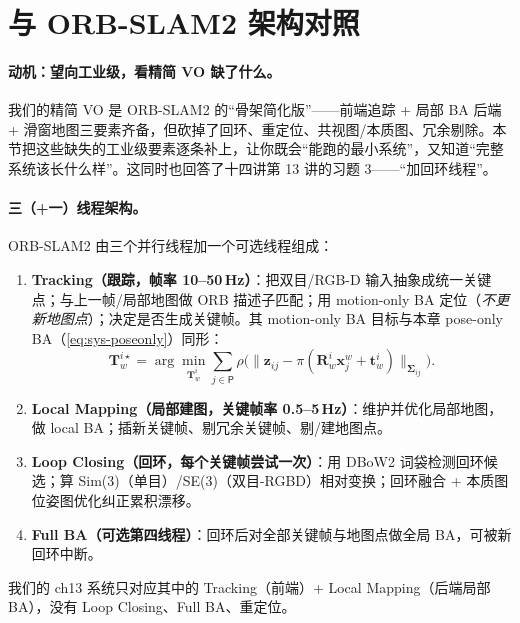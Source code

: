 \section{与 ORB-SLAM2 架构对照}
\label{sec:sys-orbslam}
\label{sec:sys-loop}

\paragraph{动机：望向工业级，看精简 VO 缺了什么。}
我们的精简 VO 是 ORB-SLAM2 的“骨架简化版”——前端追踪 + 局部 BA 后端 + 滑窗地图三要素齐备，但砍掉了回环、重定位、共视图/本质图、冗余剔除。本节把这些缺失的工业级要素逐条补上，让你既会“能跑的最小系统”，又知道“完整系统该长什么样”。这同时也回答了十四讲第 13 讲的习题 3——“加回环线程”。

\paragraph{三（+一）线程架构。}
ORB-SLAM2\cite{murartal2017orbslam2} 由三个并行线程加一个可选线程组成：
\begin{enumerate}
  \item \textbf{Tracking（跟踪，帧率 10--50\,Hz）}：把双目/RGB-D 输入抽象成统一关键点；与上一帧/局部地图做 ORB 描述子匹配；用 motion-only BA 定位（\emph{不更新地图点}）；决定是否生成关键帧。其 motion-only BA 目标与本章 pose-only BA（\cref{eq:sys-poseonly}）同形：
  \begin{equation}
  \mathbf{T}_w^{i\star}=\arg\min_{\mathbf{T}_w^i}\sum_{j\in\mathsf{P}}\rho\Big(\big\|\mathbf{z}_{ij}-\pi(\mathbf{R}_w^i\mathbf{x}_j^w+\mathbf{t}_w^i)\big\|_{\boldsymbol\Sigma_{ij}}\Big).
  \label{eq:sys-orb-motiononly}
  \end{equation}
  \item \textbf{Local Mapping（局部建图，关键帧率 0.5--5\,Hz）}：维护并优化局部地图，做 local BA；插新关键帧、剔冗余关键帧、剔/建地图点。
  \item \textbf{Loop Closing（回环，每个关键帧尝试一次）}：用 DBoW2 词袋检测回环候选；算 Sim(3)（单目）/SE(3)（双目-RGBD）相对变换；回环融合 + 本质图位姿图优化纠正累积漂移。
  \item \textbf{Full BA（可选第四线程）}：回环后对全部关键帧与地图点做全局 BA，可被新回环中断。
\end{enumerate}
我们的 ch13 系统只对应其中的 Tracking（前端）+ Local Mapping（后端局部 BA），没有 Loop Closing、Full BA、重定位。

